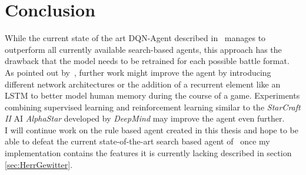 
\chapter{Conclusion}
\label{ch:conclusion}

While the current state of the art DQN-Agent described in~\autocite{Huang_Lee_2019}
manages to outperform all currently available search-based agents, this approach
has the drawback that the model needs to be retrained for each possible battle
format. As pointed out by~\autocite{Huang_Lee_2019}, further work might improve
the agent by introducing \grqq different network architectures or the addition
of a recurrent element like an LSTM to better model human memory during the 
course of a game\grqq. Experiments combining supervised learning and
reinforcement learning similar to the \textit{StarCraft II} AI \textit{AlphaStar} 
developed by \textit{DeepMind} may improve the agent even further. \\
I will continue work on the rule based agent created in this thesis and hope to
be able to defeat the current state-of-the-art search based agent of~\autocite{Github:pmariglia-showdown}
once my implementation contains the features it is currently lacking described in section 
\ref{sec:HerrGewitter}.
